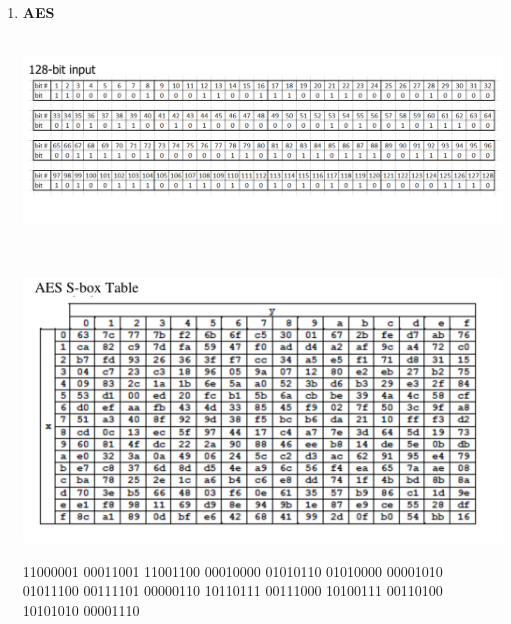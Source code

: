 \documentclass[12pt]{article}
\begin{document}
\begin{enumerate}
\item \textbf{AES}
\\~\\
  \centerline{\includegraphics[width=1.1\textwidth]{pictures/AES_1}}
\\
\centerline{\includegraphics[width=1.1\textwidth]{pictures/AES_2}}
\newpage
11000001 00011001 11001100 00010000
01010110 01010000 00001010 01011100
00111101 00000110 10110111 00111000
10100111 00110100 10101010 00001110



\end{enumerate}
\end{document}
